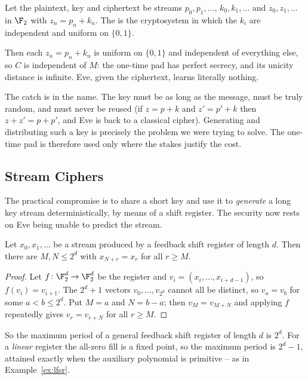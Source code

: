 \begin{definition}
	Let the plaintext, key and ciphertext be streams $p_0,p_1,\dots$, $k_0,k_1,\dots$ and $z_0,z_1,\dots$ in $\F_2$ with $z_n = p_n+k_n$. The  is the cryptosystem in which the $k_i$ are independent and uniform on $\{0,1\}$.
\end{definition}

Then each $z_n = p_n + k_n$ is uniform on $\{0,1\}$ and independent of everything else, so $C$ is independent of $M$: the one-time pad has perfect secrecy, and its unicity distance is infinite. Eve, given the ciphertext, learns literally nothing.

The catch is in the name. The key must be as long as the message, must be truly random, and must never be reused (if $z = p+k$ and $z' = p'+k$ then $z + z' = p+p'$, and Eve is back to a classical cipher). Generating and distributing such a key is precisely the problem we were trying to solve. The one-time pad is therefore used only where the stakes justify the cost.

\subsection{Stream Ciphers}

The practical compromise is to share a short key and use it to \emph{generate} a long key stream deterministically, by means of a shift register. The security now rests on Eve being unable to predict the stream.

\begin{lemma}\label{lem:period}
	Let $x_0,x_1,\dots$ be a stream produced by a feedback shift register of length $d$. Then there are $M,N\le2^d$ with $x_{N+r}=x_r$ for all $r \ge M$.
\end{lemma}

\begin{proof}
	Let $f\colon\F_2^d\to\F_2^d$ be the register and $v_i = (x_i,\dots,x_{i+d-1})$, so $f(v_i)=v_{i+1}$. The $2^d+1$ vectors $v_0,\dots,v_{2^d}$ cannot all be distinct, so $v_a=v_b$ for some $a<b\le2^d$. Put $M = a$ and $N = b-a$; then $v_M = v_{M+N}$ and applying $f$ repeatedly gives $v_r = v_{r+N}$ for all $r \ge M$.
\end{proof}

\begin{remark}
	So the maximum period of a general feedback shift register of length $d$ is $2^d$. For a \emph{linear} register the all-zero fill is a fixed point, so the maximum period is $2^d-1$, attained exactly when the auxiliary polynomial is primitive -- as in Example~\ref{ex:lfsr}.
\end{remark}

